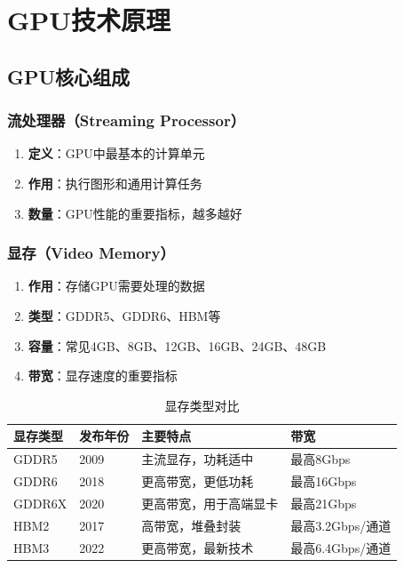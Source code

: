\documentclass[12pt,UTF8]{ctexbook}
\begin{document}
\part{GPU技术原理}

\chapter{GPU核心组成}

\section{流处理器（Streaming Processor）}

\begin{enumerate}
    \item \textbf{定义}：GPU中最基本的计算单元
    \item \textbf{作用}：执行图形和通用计算任务
    \item \textbf{数量}：GPU性能的重要指标，越多越好
\end{enumerate}

\section{显存（Video Memory）}

\begin{enumerate}
    \item \textbf{作用}：存储GPU需要处理的数据
    \item \textbf{类型}：GDDR5、GDDR6、HBM等
    \item \textbf{容量}：常见4GB、8GB、12GB、16GB、24GB、48GB
    \item \textbf{带宽}：显存速度的重要指标
\end{enumerate}

\begin{table}[H]
    \centering
    \begin{tabular}{|p{2cm}|p{3cm}|p{5cm}|p{3cm}|}
        \hline
        \textbf{显存类型} & \textbf{发布年份} & \textbf{主要特点} & \textbf{带宽} \\
        \hline
        GDDR5 & 2009 & 主流显存，功耗适中 & 最高8Gbps \\
        \hline
        GDDR6 & 2018 & 更高带宽，更低功耗 & 最高16Gbps \\
        \hline
        GDDR6X & 2020 & 更高带宽，用于高端显卡 & 最高21Gbps \\
        \hline
        HBM2 & 2017 & 高带宽，堆叠封装 & 最高3.2Gbps/通道 \\
        \hline
        HBM3 & 2022 & 更高带宽，最新技术 & 最高6.4Gbps/通道 \\
        \hline
    \end{tabular}
    \caption{显存类型对比}
    \label{tab:vram_types}
\end{table}
\end{document}
